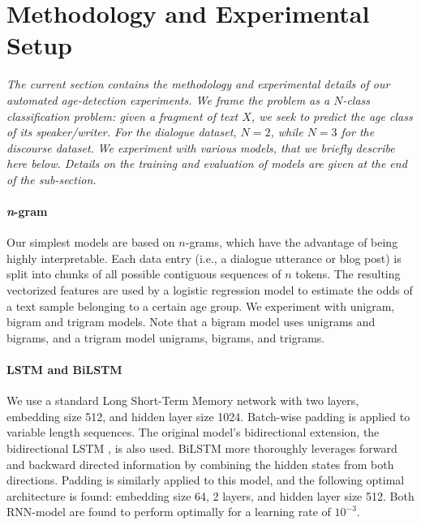 \section{Methodology and Experimental Setup}
\label{sec:exp1_methods_exp_setup}

\textit{The current section contains the methodology and experimental details of our automated age-detection experiments. We frame the problem as a $N$-class classification problem: given a fragment of text $X$, we seek to predict
the age class of its speaker/writer.
For the dialogue dataset, $N=2$, while $N=3$ for the discourse dataset.}
\textit{We experiment with various models, that we briefly describe here below. Details on the training and evaluation of models are given at the end of the sub-section.
}%


\paragraph{\textit{n}-gram} 
Our simplest models are based on $n$-grams, which have the advantage of being highly interpretable.
Each data entry (i.e., a dialogue utterance or blog post) is split into chunks of all possible contiguous sequences of $n$ tokens. The resulting vectorized features are used by a logistic regression model to estimate the odds of a text sample belonging to a certain age group. We experiment with unigram, bigram and trigram models. Note that a bigram model uses unigrams and bigrams, and a trigram model unigrams, bigrams, and trigrams.

\paragraph{LSTM and BiLSTM} We
use a standard Long Short-Term Memory network \cite[LSTM;][]{hochreiter1997long} with two layers, embedding size 512, and hidden layer size 1024. Batch-wise padding is applied to variable length sequences. The original model's bidirectional extension, the bidirectional LSTM \cite[BiLSTM;][]{schuster1997bidirectional}, is also used.
BiLSTM more thoroughly leverages forward and backward directed information by combining the hidden states from both directions. Padding is similarly applied to this model, and the following optimal architecture is found: embedding size 64, 2 layers, and hidden layer size 512. Both RNN-model are found to perform optimally for a learning rate of $10^{-3}$.

